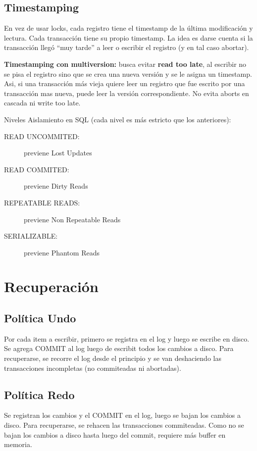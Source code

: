 \subsection{Timestamping}

En vez de usar locks, cada registro tiene el timestamp de la última modificación y lectura.
Cada transacción tiene su propio timestamp.
La idea es darse cuenta si la transacción llegó ``muy tarde'' a leer o escribir el registro (y en tal caso abortar).

\textbf{Timestamping con multiversion:} busca evitar \textbf{read too late}, al escribir no se pisa el registro sino que se crea una nueva versión y se le asigna un timestamp.
Asi, si una transacción más vieja quiere leer un registro que fue escrito por una transacción mas nueva, puede leer la versión correspondiente.
No evita aborts en cascada ni write too late.

Niveles Aislamiento en SQL (cada nivel es más estricto que los anteriores):

\begin{description}
	\item[READ UNCOMMITED:] previene Lost Updates
	\item[READ COMMITED:] previene Dirty Reads
	\item[REPEATABLE READS:] previene Non Repeatable Reads
	\item[SERIALIZABLE:] previene Phantom Reads
\end{description}

\section{Recuperación}

\subsection{Política Undo}

Por cada item a escribir, primero se registra en el log y luego se escribe en disco.
Se agrega COMMIT al log luego de escribit todos los cambios a disco.
Para recuperarse, se recorre el log desde el principio y se van deshaciendo las transacciones incompletas (no commiteadas ni abortadas).

\subsection{Política Redo}

Se registran los cambios y el COMMIT en el log, luego se bajan los cambios a disco.
Para recuperarse, se rehacen las transacciones commiteadas.
Como no se bajan los cambios a disco hasta luego del commit, requiere más buffer en memoria.

